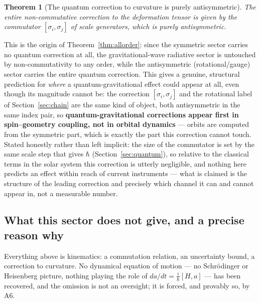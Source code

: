 \documentclass[pdflatex,sn-mathphys-num]{sn-jnl}
\theoremstyle{thmstyleone}
\newtheorem{theorem}{Theorem}
\theoremstyle{thmstylethree}
\theoremstyle{thmstyletwo}
\begin{document}
\begin{theorem}[The quantum correction to curvature is purely antisymmetric]\label{thm:ncconf}
The entire non-commutative correction to the deformation tensor is given
by the commutator $[\sigma_i,\sigma_j]$ of scale generators, which is
purely antisymmetric.
\end{theorem}

This is the origin of Theorem~\ref{thm:allorder}: since the symmetric
sector carries no quantum correction at all, the gravitational-wave
radiative sector is untouched by non-commutativity to any order, while
the antisymmetric (rotational/gauge) sector carries the entire quantum
correction. This gives a genuine, structural prediction for \emph{where}
a quantum-gravitational effect could appear at all, even though its
magnitude cannot be: the correction $[\sigma_i,\sigma_j]$ and the
rotational label of Section~\ref{sec:chain} are the same kind of
object, both antisymmetric in the same index pair, so
\textbf{quantum-gravitational corrections appear first in
spin–geometry coupling, not in orbital dynamics} — orbits are computed
from the symmetric part, which is exactly the part this correction
cannot touch. Stated honestly rather than left implicit: the size of
the commutator is set by the same scale step that gives $\hbar$
(Section~\ref{sec:quantum}), so relative to the classical terms in the
solar system this correction is utterly negligible, and nothing here
predicts an effect within reach of current instruments — what is
claimed is the structure of the leading correction and precisely which
channel it can and cannot appear in, not a measurable number.

\subsection{What this sector does not give, and a precise reason why}\label{ss:nodynamics}

Everything above is kinematics: a commutation relation, an uncertainty
bound, a correction to curvature. No dynamical equation of motion — no
Schrödinger or Heisenberg picture, nothing playing the role of
$da/dt=\tfrac{i}{\hbar}[H,a]$ — has been recovered, and the omission is
not an oversight; it is forced, and provably so, by A6.
\end{document}
